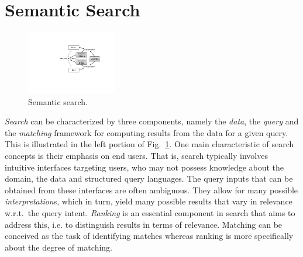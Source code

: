 \section{Semantic Search}\label{sec:ss}

\begin{figure}
	\centering
		\includegraphics[width=0.35\textwidth]{figs/semsearch.pdf}
	\caption{Semantic search.}
	\label{fig:semsearch}
	\vspace{-0.7cm}
\end{figure}

\emph{Search} can be characterized by three components, namely the \emph{data}, the \emph{query} and the \emph{matching} framework for computing results from the data for a given query. This is illustrated in the left portion of Fig.~\ref{fig:semsearch}. One main characteristic of search concepts is their emphasis on end users. That is, search typically involves intuitive interfaces targeting users, who may not possess knowledge about the domain, the data and structured query languages. The query inputs that can be obtained from these interfaces are often ambiguous. They allow for many possible \emph{interpretation}s, which in turn, yield many possible results that vary in relevance w.r.t.~the query intent. 
\emph{Ranking} is an essential component in search that aims to address this, i.e. to distinguish results in terms of relevance. Matching can be conceived as the task of identifying matches whereas ranking is more specifically about the degree of matching.   

